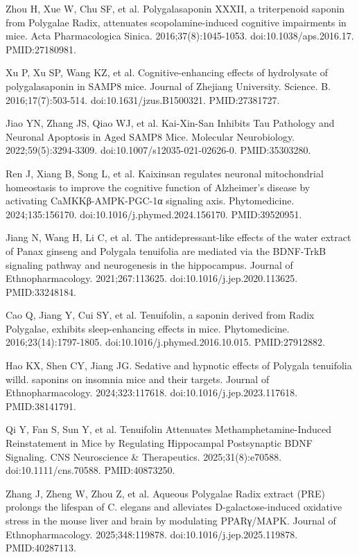 \documentclass[12pt,oneside]{book}
\newcommand{\reff}[2]{\par\hangindent=7mm\hangafter=1\noindent[#1]\hspace{2mm}#2\par}
\begin{document}
\reff{31}{Zhou H, Xue W, Chu SF, et al. Polygalasaponin XXXII, a triterpenoid saponin from Polygalae Radix, attenuates scopolamine-induced cognitive impairments in mice. Acta Pharmacologica Sinica. 2016;37(8):1045-1053. doi:10.1038/aps.2016.17. PMID:27180981.}

\reff{32}{Xu P, Xu SP, Wang KZ, et al. Cognitive-enhancing effects of hydrolysate of polygalasaponin in SAMP8 mice. Journal of Zhejiang University. Science. B. 2016;17(7):503-514. doi:10.1631/jzus.B1500321. PMID:27381727.}

\reff{33}{Jiao YN, Zhang JS, Qiao WJ, et al. Kai-Xin-San Inhibits Tau Pathology and Neuronal Apoptosis in Aged SAMP8 Mice. Molecular Neurobiology. 2022;59(5):3294-3309. doi:10.1007/s12035-021-02626-0. PMID:35303280.}

\reff{34}{Ren J, Xiang B, Song L, et al. Kaixinsan regulates neuronal mitochondrial homeostasis to improve the cognitive function of Alzheimer's disease by activating CaMKKβ-AMPK-PGC-1α signaling axis. Phytomedicine. 2024;135:156170. doi:10.1016/j.phymed.2024.156170. PMID:39520951.}

\reff{35}{Jiang N, Wang H, Li C, et al. The antidepressant-like effects of the water extract of Panax ginseng and Polygala tenuifolia are mediated via the BDNF-TrkB signaling pathway and neurogenesis in the hippocampus. Journal of Ethnopharmacology. 2021;267:113625. doi:10.1016/j.jep.2020.113625. PMID:33248184.}

\reff{36}{Cao Q, Jiang Y, Cui SY, et al. Tenuifolin, a saponin derived from Radix Polygalae, exhibits sleep-enhancing effects in mice. Phytomedicine. 2016;23(14):1797-1805. doi:10.1016/j.phymed.2016.10.015. PMID:27912882.}

\reff{37}{Hao KX, Shen CY, Jiang JG. Sedative and hypnotic effects of Polygala tenuifolia willd. saponins on insomnia mice and their targets. Journal of Ethnopharmacology. 2024;323:117618. doi:10.1016/j.jep.2023.117618. PMID:38141791.}

\reff{38}{Qi Y, Fan S, Sun Y, et al. Tenuifolin Attenuates Methamphetamine-Induced Reinstatement in Mice by Regulating Hippocampal Postsynaptic BDNF Signaling. CNS Neuroscience \& Therapeutics. 2025;31(8):e70588. doi:10.1111/cns.70588. PMID:40873250.}

\reff{39}{Zhang J, Zheng W, Zhou Z, et al. Aqueous Polygalae Radix extract (PRE) prolongs the lifespan of C. elegans and alleviates D-galactose-induced oxidative stress in the mouse liver and brain by modulating PPARγ/MAPK. Journal of Ethnopharmacology. 2025;348:119878. doi:10.1016/j.jep.2025.119878. PMID:40287113.}
\end{document}
